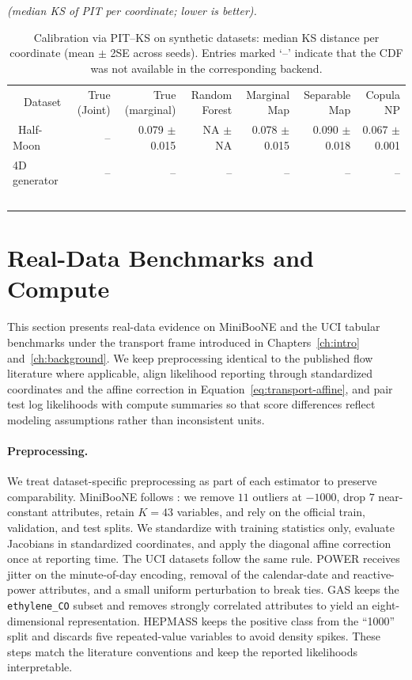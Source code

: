 \documentclass[11pt,a4paper,twoside]{book}\usepackage[]{graphicx}\usepackage[]{xcolor}
\begin{document}
\begin{table}[htbp]
  \centering
  \textit{(median KS of PIT per coordinate; lower is better).}\

  \begin{tabular}{lrrrrrr}\
    \hline\
    Dataset & True (Joint) & True (marginal) & Random Forest & Marginal Map & Separable Map & Copula NP \\\n     \hline\
    Half-Moon & -- & 0.079 $\pm$ 0.015 & NA $\pm$ NA & 0.078 $\pm$ 0.015 & 0.090 $\pm$ 0.018 & 0.067 $\pm$ 0.001 \\
    4D generator & -- & -- & -- & -- & -- & -- \\
    \hline\
  \end{tabular}
  \caption{Calibration via PIT--KS on synthetic datasets: median KS distance per coordinate (mean $\pm$ 2SE across seeds). Entries marked `--' indicate that the CDF was not available in the corresponding backend.}
  \label{tab:ks-synth}
\end{table}


\section{Real-Data Benchmarks and Compute}\label{sec:realdata}

This section presents real-data evidence on MiniBooNE and the UCI tabular benchmarks under the transport frame introduced in Chapters~\ref{ch:intro} and~\ref{ch:background}. We keep preprocessing identical to the published flow literature where applicable, align likelihood reporting through standardized coordinates and the affine correction in Equation~\eqref{eq:transport-affine}, and pair test log likelihoods with compute summaries so that score differences reflect modeling assumptions rather than inconsistent units.

\paragraph{Preprocessing.} We treat dataset-specific preprocessing as part of each estimator to preserve comparability. MiniBooNE follows \citet{papamakarios2017masked}: we remove $11$ outliers at $-1000$, drop $7$ near-constant attributes, retain $K=43$ variables, and rely on the official train, validation, and test splits. We standardize with training statistics only, evaluate Jacobians in standardized coordinates, and apply the diagonal affine correction once at reporting time. The UCI datasets follow the same rule. POWER receives jitter on the minute-of-day encoding, removal of the calendar-date and reactive-power attributes, and a small uniform perturbation to break ties. GAS keeps the \texttt{ethylene\_CO} subset and removes strongly correlated attributes to yield an eight-dimensional representation. HEPMASS keeps the positive class from the ``1000'' split and discards five repeated-value variables to avoid density spikes. These steps match the literature conventions and keep the reported likelihoods interpretable.
\end{document}
